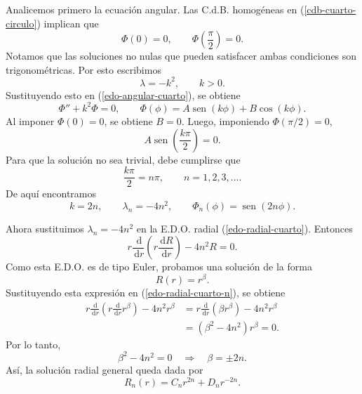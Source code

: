 \documentclass[11pt]{article}
\newcommand{\dd}{\,\mathrm{d}}
\newcommand{\sen}{\operatorname{sen}}
\begin{document}
Analicemos primero la ecuación angular. Las C.d.B. homogéneas en (\ref{cdb-cuarto-circulo}) implican que
\begin{equation*}
\Phi(0)=0,
\qquad
\Phi\left(\frac{\pi}{2}\right)=0.
\end{equation*}
Notamos que las soluciones no nulas que pueden satisfacer ambas condiciones son trigonométricas. Por esto escribimos
\begin{equation*}
\lambda=-k^2,
\qquad k>0.
\end{equation*}
Sustituyendo esto en (\ref{edo-angular-cuarto}), se obtiene
\begin{equation*}
\Phi''+k^2\Phi=0,
\qquad
\Phi(\phi)=A\sen(k\phi)+B\cos(k\phi).
\end{equation*}
Al imponer $\Phi(0)=0$, se obtiene $B=0$. Luego, imponiendo $\Phi(\pi/2)=0$,
\begin{equation*}
A\sen\left(\frac{k\pi}{2}\right)=0.
\end{equation*}
Para que la solución no sea trivial, debe cumplirse que
\begin{equation*}
\frac{k\pi}{2}=n\pi,
\qquad n=1,2,3,\ldots.
\end{equation*}
De aquí encontramos
\begin{equation}
\label{espectro-angular-cuarto}
k=2n,
\qquad
\lambda_n=-4n^2,
\qquad
\Phi_n(\phi)=\sen(2n\phi).
\end{equation}

Ahora sustituimos $\lambda_n=-4n^2$ en la E.D.O. radial (\ref{edo-radial-cuarto}). Entonces
\begin{equation}
\label{edo-radial-cuarto-n}
r\frac{\dd}{\dd r}\left(r\frac{\dd R}{\dd r}\right)-4n^2R=0.
\end{equation}
Como esta E.D.O. es de tipo Euler, probamos una solución de la forma
\begin{equation*}
R(r)=r^\beta.
\end{equation*}
Sustituyendo esta expresión en (\ref{edo-radial-cuarto-n}), se obtiene
\begin{align*}
r\frac{\dd}{\dd r}\left(r\frac{\dd}{\dd r}r^\beta\right)-4n^2r^\beta
&=r\frac{\dd}{\dd r}\left(\beta r^\beta\right)-4n^2r^\beta\\
&=(\beta^2-4n^2)r^\beta=0.
\end{align*}
Por lo tanto,
\begin{equation*}
\beta^2-4n^2=0
\quad\Rightarrow\quad
\beta=\pm 2n.
\end{equation*}
Así, la solución radial general queda dada por
\begin{equation}
\label{radial-general-cuarto}
R_n(r)=C_nr^{2n}+D_nr^{-2n}.
\end{equation}
\end{document}
